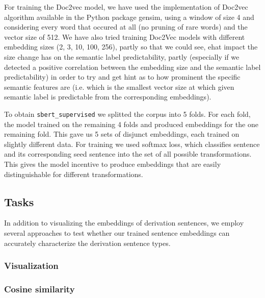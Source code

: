 \documentclass[11pt]{article}
\newcommand{\Embed}[1]{\texttt{#1}}
\begin{document}
For training the Doc2vec model, we have used the implementation of Doc2vec
algorithm available in the Python package gensim, using a window of size 4 and
considering every word that occured at all (no pruning of rare words) and the
vector size of 512. We have also tried training Doc2Vec models with different
embedding sizes (2, 3, 10, 100, 256), partly so that we could see, ehat impact
the size change has on the semantic label predictability, partly (especially if
we detected a positive correlation between the embedding size and the semantic
label predictability) in order to try and get hint as to how prominent the
specific semantic features are (i.e. which is the smallest vector size at which
given semantic label is predictable from the corresponding embeddings).


To obtain \Embed{sbert\_supervised} we splitted the corpus into 5 folds. For
each fold, the model trained on the remaining 4 folds and produced embeddings
for the one remaining fold. This gave us 5 sets of disjunct embeddings, each
trained on slightly different data. For training we used softmax loss, which
classifies sentence and its corresponding seed sentence into the set of all
possible transformations. This gives the model incentive to produce embeddings
that are easily distinguishable for different transformations.


\subsection{Tasks}







In addition to visualizing the embeddings of derivation sentences, we employ
several approaches to test whether our trained sentence embeddings can
accurately characterize the derivation sentence types.

\subsubsection{Visualization}



\subsubsection{Cosine similarity}
\end{document}
